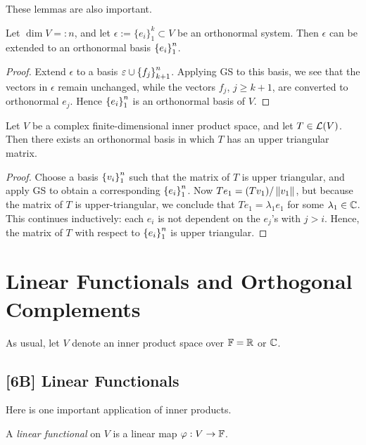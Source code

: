 \documentclass{article}
\begin{document}
These lemmas are also important.
\begin{lemma}
Let $\dim V =: n$, and let $\epsilon := \{e_i\}_1^k\subset V$ be an orthonormal system. Then $\epsilon$ can be extended to an orthonormal basis $\left\{e_i\right\}_1^n$.
\end{lemma}
\begin{proof}
Extend $\epsilon$ to a basis $\varepsilon \cup \left\{f_j\right\}_{k+1}^n$. Applying GS to this basis, we see that the vectors in $\epsilon$ remain unchanged, while the vectors $f_j$, $j\geq k+1$, are converted to orthonormal $e_j$. Hence $\left\{e_i\right\}_1^n$ is an orthonormal basis of $V$.
\end{proof}
\begin{lemma}
Let $V$ be a complex finite-dimensional inner product space, and let $T\in\mathcal L(V)$. Then there exists an orthonormal basis in which $T$ has an upper triangular matrix.
\end{lemma}
\begin{proof}
Choose a basis $\left\{v_i\right\}_1^n$ such that the matrix of $T$ is upper triangular, and apply GS to obtain a corresponding $\left\{e_i\right\}_1^n$. Now $Te_1 = (Tv_1)/ \left\Vert v_1\right\Vert$, but because the matrix of $T$ is upper-triangular, we conclude that $Te_1 = \lambda_1e_1$ for some $\lambda_1\in\mathbb C$. This continues inductively: each $e_i$ is not dependent on the $e_j$'s with $j>i$. Hence, the matrix of $T$ with respect to $\left\{e_i\right\}_1^n$ is upper triangular.
\end{proof}
\section{Linear Functionals and Orthogonal Complements}
As usual, let $V$ denote an inner product space over $\mathbb F = \mathbb R$ or $\mathbb C$.
\subsection*{[6B] Linear Functionals}
Here is one important application of inner products.
\begin{definition}
A \textit{linear functional} on $V$ is a linear map $\varphi: V\to \mathbb F$.
\end{definition}
\end{document}
